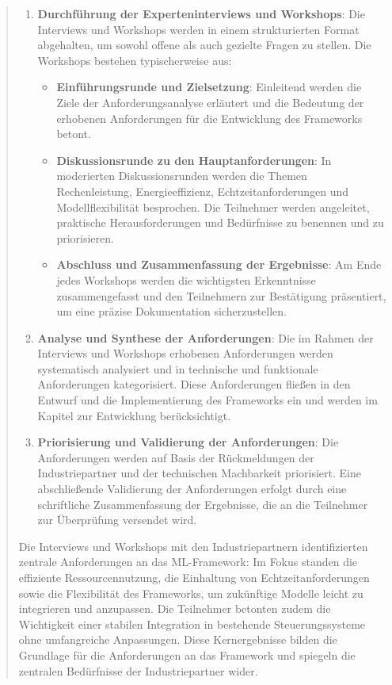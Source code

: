 \begin{quote}
\begin{enumerate}
    \item \textbf{Durchführung der Experteninterviews und Workshops}: Die Interviews und Workshops werden in einem strukturierten Format abgehalten, um sowohl offene als auch gezielte Fragen zu stellen. Die Workshops bestehen typischerweise aus:
    \begin{itemize}
        \item \textbf{Einführungsrunde und Zielsetzung}: Einleitend werden die Ziele der Anforderungsanalyse erläutert und die Bedeutung der erhobenen Anforderungen für die Entwicklung des Frameworks betont.
        \item \textbf{Diskussionsrunde zu den Hauptanforderungen}: In moderierten Diskussionsrunden werden die Themen Rechenleistung, Energieeffizienz, Echtzeitanforderungen und Modellflexibilität besprochen. Die Teilnehmer werden angeleitet, praktische Herausforderungen und Bedürfnisse zu benennen und zu priorisieren.
        \item \textbf{Abschluss und Zusammenfassung der Ergebnisse}: Am Ende jedes Workshops werden die wichtigsten Erkenntnisse zusammengefasst und den Teilnehmern zur Bestätigung präsentiert, um eine präzise Dokumentation sicherzustellen.
    \end{itemize}

    \item \textbf{Analyse und Synthese der Anforderungen}: Die im Rahmen der Interviews und Workshops erhobenen Anforderungen werden systematisch analysiert und in technische und funktionale Anforderungen kategorisiert. Diese Anforderungen fließen in den Entwurf und die Implementierung des Frameworks ein und werden im Kapitel zur Entwicklung berücksichtigt.

    \item \textbf{Priorisierung und Validierung der Anforderungen}: Die Anforderungen werden auf Basis der Rückmeldungen der Industriepartner und der technischen Machbarkeit priorisiert. Eine abschließende Validierung der Anforderungen erfolgt durch eine schriftliche Zusammenfassung der Ergebnisse, die an die Teilnehmer zur Überprüfung versendet wird.
\end{enumerate}
Die Interviews und Workshops mit den Industriepartnern identifizierten zentrale Anforderungen an das ML-Framework: Im Fokus standen die effiziente Ressourcennutzung, 
die Einhaltung von Echtzeitanforderungen sowie die Flexibilität des Frameworks, um zukünftige Modelle leicht zu integrieren und anzupassen. 
Die Teilnehmer betonten zudem die Wichtigkeit einer stabilen Integration in bestehende Steuerungssysteme ohne umfangreiche Anpassungen. 
Diese Kernergebnisse bilden die Grundlage für die Anforderungen an das Framework und spiegeln die zentralen Bedürfnisse der Industriepartner wider.
\end{quote}

